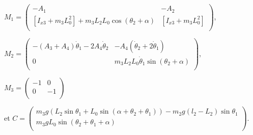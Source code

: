 \begin{corrige}
$M_1 = \begin{pmatrix}
-A_1 & - A_2 \\
\left[I_{x 3}+m_{3} L_{0}^{2}\right]  +m_{3} L_{2} L_{0}\cos \left(\theta_{2}+\alpha\right) & \left[I_{x 3}+m_{3} L_{0}^{2}\right] \\
\end{pmatrix}$,

$M_2 = \begin{pmatrix}
-\left(A_{3}+A_4\right) \dot{\theta}_{1}-2A_4 \dot{\theta}_2  & -A_4\left(\dot{\theta}_2+2\dot{\theta}_1\right) \\
0 & m_{3} L_{2} L_{0} \dot{\theta}_{1} \sin \left(\theta_{2}+\alpha\right) \\
\end{pmatrix}$, 

$M_3 = \begin{pmatrix}
- 1 & 0 \\
0 & - 1  \\
\end{pmatrix}$

et 
$C = \begin{pmatrix}
 m_3 g\left(  L_2 \sin \theta_1 +  L_0 \sin\left( \alpha + \theta_2 + \theta_1\right)\right) - m_2 g\left( l_2 - L_2\right) \sin \theta_1 \\
m_{3} g L_{0} \sin \left(\theta_{2}+\theta_{1}+\alpha\right) \\
\end{pmatrix}$.

\end{corrige}
\else
\fi

